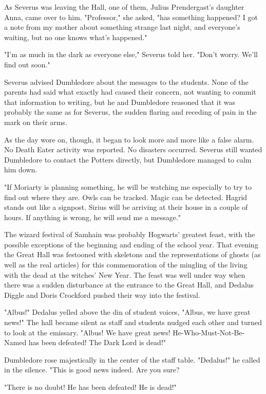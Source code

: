 As Severus was leaving the Hall, one of them, Julius Prendergast's daughter Anna, came over to him. "Professor," she asked, "has something happened? I got a note from my mother about something strange last night, and everyone's waiting, but no one knows what's happened."

"I'm as much in the dark as everyone else," Severus told her. "Don't worry. We'll find out soon."

Severus advised Dumbledore about the messages to the students. None of the parents had said what exactly had caused their concern, not wanting to commit that information to writing, but he and Dumbledore reasoned that it was probably the same as for Severus, the sudden flaring and receding of pain in the mark on their arms.

As the day wore on, though, it began to look more and more like a false alarm. No Death Eater activity was reported. No disasters occurred. Severus still wanted Dumbledore to contact the Potters directly, but Dumbledore managed to calm him down.

"If Moriarty is planning something, he will be watching me especially to try to find out where they are. Owls can be tracked. Magic can be detected. Hagrid stands out like a signpost. Sirius will be arriving at their house in a couple of hours. If anything is wrong, he will send me a message."

The wizard festival of Samhain was probably Hogwarts' greatest feast, with the possible exceptions of the beginning and ending of the school year. That evening the Great Hall was festooned with skeletons and the representations of ghosts (as well as the real articles) for this commemoration of the mingling of the living with the dead at the witches' New Year. The feast was well under way when there was a sudden disturbance at the entrance to the Great Hall, and Dedalus Diggle and Doris Crockford pushed their way into the festival.

"Albus!" Dedalus yelled above the din of student voices, "Albus, we have great news!" The hall became silent as staff and students nudged each other and turned to look at the emissary. "Albus! We have great news! He-Who-Must-Not-Be-Named has been defeated! The Dark Lord is dead!"

Dumbledore rose majestically in the center of the staff table. "Dedalus!" he called in the silence. "This is good news indeed. Are you sure?

"There is no doubt! He has been defeated! He is dead!"

